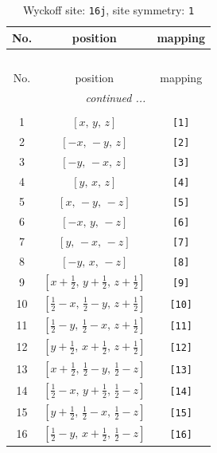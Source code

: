 \documentclass[fleqn,8pt]{jsarticle}
\begin{document}
\begin{longtable}{ccc}
\caption{Wyckoff site: {\tt 16j}, site symmetry: {\tt 1}}
 \\
 \hline \hline
No. & position & mapping \\ \hline \endfirsthead

\multicolumn{2}{l}{\tablename\ \thetable{}} \\
 \hline \hline
No. & position & mapping \\ \hline \endhead

 \hline \hline
\multicolumn{2}{r}{\footnotesize\it continued ...} \\ \endfoot

 \hline \hline
\multicolumn{2}{r}{} \\ \endlastfoot

1 & $\left[ x,\, y,\, z \right]$ & {\tt [1]} \\ \hline
2 & $\left[ - x,\, - y,\, z \right]$ & {\tt [2]} \\ \hline
3 & $\left[ - y,\, - x,\, z \right]$ & {\tt [3]} \\ \hline
4 & $\left[ y,\, x,\, z \right]$ & {\tt [4]} \\ \hline
5 & $\left[ x,\, - y,\, - z \right]$ & {\tt [5]} \\ \hline
6 & $\left[ - x,\, y,\, - z \right]$ & {\tt [6]} \\ \hline
7 & $\left[ y,\, - x,\, - z \right]$ & {\tt [7]} \\ \hline
8 & $\left[ - y,\, x,\, - z \right]$ & {\tt [8]} \\ \hline
9 & $\left[ x + \frac{1}{2},\, y + \frac{1}{2},\, z + \frac{1}{2} \right]$ & {\tt [9]} \\ \hline
10 & $\left[ \frac{1}{2} - x,\, \frac{1}{2} - y,\, z + \frac{1}{2} \right]$ & {\tt [10]} \\ \hline
11 & $\left[ \frac{1}{2} - y,\, \frac{1}{2} - x,\, z + \frac{1}{2} \right]$ & {\tt [11]} \\ \hline
12 & $\left[ y + \frac{1}{2},\, x + \frac{1}{2},\, z + \frac{1}{2} \right]$ & {\tt [12]} \\ \hline
13 & $\left[ x + \frac{1}{2},\, \frac{1}{2} - y,\, \frac{1}{2} - z \right]$ & {\tt [13]} \\ \hline
14 & $\left[ \frac{1}{2} - x,\, y + \frac{1}{2},\, \frac{1}{2} - z \right]$ & {\tt [14]} \\ \hline
15 & $\left[ y + \frac{1}{2},\, \frac{1}{2} - x,\, \frac{1}{2} - z \right]$ & {\tt [15]} \\ \hline
16 & $\left[ \frac{1}{2} - y,\, x + \frac{1}{2},\, \frac{1}{2} - z \right]$ & {\tt [16]} \\
\end{longtable}
\end{document}
